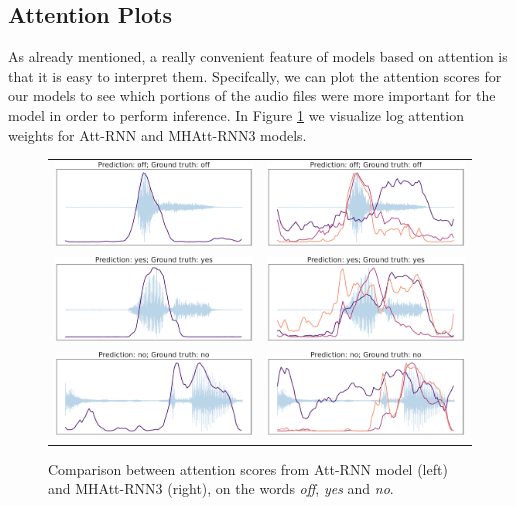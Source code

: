 \subsection{Attention Plots}
As already mentioned, a really convenient feature of models based on attention is that it is easy to interpret them. Specifcally, we can plot the attention scores for our models to see which portions of the audio files were more important for the model in order to perform inference. In Figure \ref{fig:att_scores} we visualize log attention weights for Att-RNN and MHAtt-RNN3 models. 
\begin{figure}
	\centering
	\begin{tabular}{cc}
		\includegraphics[width = 0.45\linewidth]{imgs/att_scores12_23_andreade.pdf} &
		\includegraphics[width = 0.45\linewidth]{imgs/att_scores12_23.pdf}\\
		\includegraphics[width = 0.45\linewidth]{imgs/att_scores12_42_andreade.pdf} &
		\includegraphics[width = 0.45\linewidth]{imgs/att_scores12_42.pdf}\\
		\includegraphics[width = 0.45\linewidth]{imgs/att_scores12_72_andreade.pdf} &
		\includegraphics[width = 0.45\linewidth]{imgs/att_scores12_72.pdf}
	\end{tabular}
	\caption{Comparison between attention scores from  Att-RNN model (left) and MHAtt-RNN3 (right), on the words \textit{off}, \textit{yes} and \textit{no}. }
	\label{fig:att_scores}
\end{figure}
